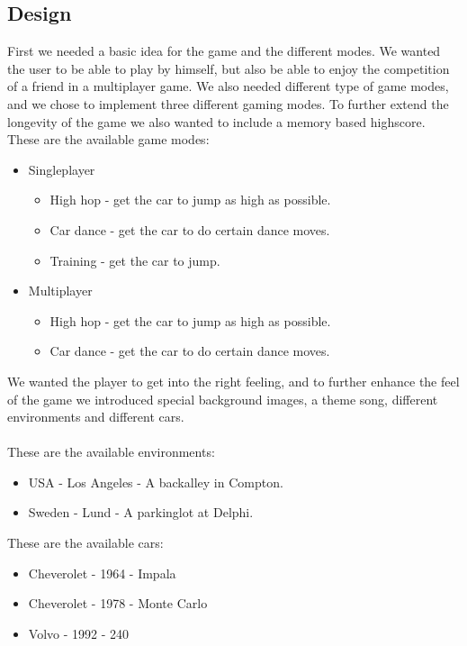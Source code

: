 \documentclass{acmsiggraph}               %
\begin{document}
\subsection{Design}
First we needed a basic idea for the game and the different modes. We wanted the
user to be able to play by himself, but also be able to enjoy the competition of
a friend in a multiplayer game.
We also needed different type of game modes, and we chose to implement three different
gaming modes. To further extend the longevity of the game we also wanted to include 
a memory based highscore.
\\
These are the available game modes:
\begin{itemize}
    \item Singleplayer
    	\begin{itemize}
    		\item High hop - get the car to jump as high as possible.
    		\item Car dance -  get the car to do certain dance moves. 
    		\item Training - get the car to jump.
    	\end{itemize}
    \item Multiplayer
    	\begin{itemize}
    		\item High hop - get the car to jump as high as possible.
    		\item Car dance -  get the car to do certain dance moves. 
    	\end{itemize}
\end{itemize}

We wanted the player to get into the right feeling, and to further enhance the feel of 
the game we introduced special background images, a theme song, different environments
and different cars.
\\\\
These are the available environments: 
\begin{itemize}
    \item USA - Los Angeles - A backalley in Compton.
    \item Sweden - Lund - A parkinglot at Delphi.
\end{itemize}    
These are the available cars: 
\begin{itemize}
    \item Cheverolet - 1964 - Impala
    \item Cheverolet - 1978 - Monte Carlo
    \item Volvo - 1992 - 240
\end{itemize}    
\end{document}
